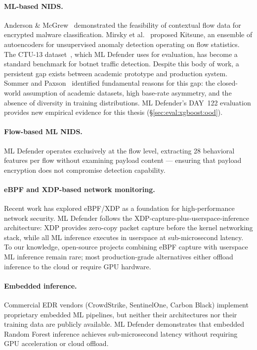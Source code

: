 \documentclass[11pt,a4paper]{article}
\begin{document}
    \paragraph{ML-based NIDS.}
    Anderson \& McGrew~\cite{anderson2016} demonstrated the feasibility of contextual flow data
    for encrypted malware classification. Mirsky et al.~\cite{mirsky2018} proposed Kitsune, an
    ensemble of autoencoders for unsupervised anomaly detection operating on flow statistics. The
    CTU-13 dataset~\cite{garcia2014}, which ML Defender uses for evaluation, has become a
    standard benchmark for botnet traffic detection. Despite this body of work, a persistent gap
    exists between academic prototype and production system. Sommer and Paxson~\cite{sommer2010}
    identified fundamental reasons for this gap: the closed-world assumption of academic datasets,
    high base-rate asymmetry, and the absence of diversity in training distributions. ML Defender's
    DAY~122 evaluation provides new empirical evidence for this thesis
    (\S\ref{sec:eval:xgboost:ood}).

    \paragraph{Flow-based ML NIDS.}
    ML Defender operates exclusively at the flow level, extracting 28 behavioral features per
    flow without examining payload content --- ensuring that payload encryption does not
    compromise detection capability.

    \paragraph{eBPF and XDP-based network monitoring.}
    Recent work has explored eBPF/XDP as a foundation for high-performance network security.
    ML Defender follows the XDP-capture-plus-userspace-inference architecture: XDP provides
    zero-copy packet capture before the kernel networking stack, while all ML inference executes
    in userspace at sub-microsecond latency. To our knowledge, open-source projects combining
    eBPF capture with userspace ML inference remain rare; most production-grade alternatives
    either offload inference to the cloud or require GPU hardware.

    \paragraph{Embedded inference.}
    Commercial EDR vendors (CrowdStrike, SentinelOne, Carbon Black) implement proprietary
    embedded ML pipelines, but neither their architectures nor their training data are publicly
    available. ML Defender demonstrates that embedded Random Forest inference achieves
    sub-microsecond latency without requiring GPU acceleration or cloud offload.
\end{document}
